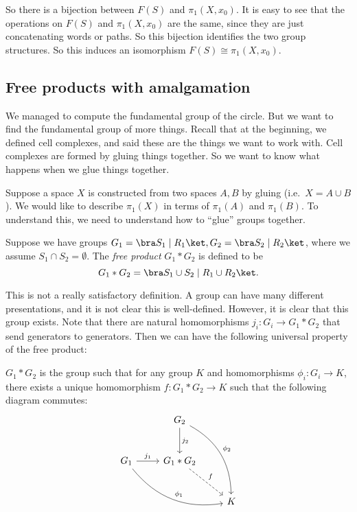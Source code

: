 \documentclass[a4paper]{article}
\begin{document}
So there is a bijection between $F(S)$ and $\pi_1(X, x_0)$. It is easy to see that the operations on $F(S)$ and $\pi_1(X, x_0)$ are the same, since they are just concatenating words or paths. So this bijection identifies the two group structures. So this induces an isomorphism $F(S)\cong \pi_1(X, x_0)$.

\subsection{Free products with amalgamation}
We managed to compute the fundamental group of the circle. But we want to find the fundamental group of more things. Recall that at the beginning, we defined cell complexes, and said these are the things we want to work with. Cell complexes are formed by gluing things together. So we want to know what happens when we glue things together.

Suppose a space $X$ is constructed from two spaces $A, B$ by gluing (i.e.\ $X = A\cup B$). We would like to describe $\pi_1(X)$ in terms of $\pi_1(A)$ and $\pi_1(B)$. To understand this, we need to understand how to ``glue'' groups together.

\begin{defi}
  Suppose we have groups $G_1 = \bra S_1 \mid R_1\ket, G_2 = \bra S_2 \mid R_2\ket$, where we assume $S_1 \cap S_2 = \emptyset$. The \emph{free product} $G_1 * G_2$ is defined to be
  \[
    G_1 * G_2 = \bra S_1 \cup S_2 \mid R_1 \cup R_2\ket.
  \]
\end{defi}
This is not a really satisfactory definition. A group can have many different presentations, and it is not clear this is well-defined. However, it is clear that this group exists. Note that there are natural homomorphisms $j_i: G_i \to G_1 * G_2$ that send generators to generators. Then we can have the following universal property of the free product:

\begin{lemma}
  $G_1 * G_2$ is the group such that for any group $K$ and homomorphisms $\phi_i: G_i \to K$, there exists a unique homomorphism $f: G_1 * G_2 \to K$ such that the following diagram commutes:
  \[
    \begin{tikzcd}[row sep=large]
      & G_2 \ar[rdd, bend left, "\phi_2"] \ar[d, "j_2"]\\
      G_1 \ar[rrd, bend right, "\phi_1"] \ar [r, "j_1"] & G_1 * G_2 \ar [rd, dashed, "f"]\\
      && K
    \end{tikzcd}
  \]
\end{lemma}
\end{document}
